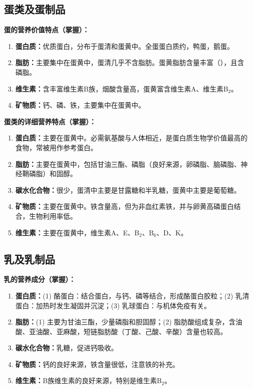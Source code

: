 \subsection{蛋类及蛋制品}

\begin{keybox}
\textbf{蛋的营养价值特点（掌握）：}
\begin{enumerate}[leftmargin=*]
    \item \textbf{蛋白质：}优质蛋白，分布于蛋清和蛋黄中。全蛋蛋白质约，鸭蛋，鹅蛋。
    \item \textbf{脂肪：}主要集中在蛋黄中，蛋清几乎不含脂肪。蛋黄脂肪含量丰富（），且含磷脂。
    \item \textbf{维生素：}含丰富维生素B族，烟酸含量高，蛋黄富含维生素A、维生素B$_2$。
    \item \textbf{矿物质：}钙、磷、铁，主要集中在蛋黄中。
\end{enumerate}
\end{keybox}

\begin{keybox}
\textbf{蛋类的详细营养特点（掌握）：}
\begin{enumerate}[leftmargin=*]
    \item \textbf{蛋白质：}主要在蛋黄中。必需氨基酸与人体相近，是蛋白质生物学价值最高的食物，常被用作参考蛋白。
    \item \textbf{脂肪：}主要在蛋黄中，包括甘油三酯、磷脂（良好来源，卵磷脂、脑磷脂、神经鞘磷脂）和固醇。
    \item \textbf{碳水化合物：}很少，蛋清中主要是甘露糖和半乳糖，蛋黄中主要是葡萄糖。
    \item \textbf{矿物质：}主要在蛋黄中。铁含量高，但为非血红素铁，并与卵黄高磷蛋白结合，生物利用率低。
    \item \textbf{维生素：}主要在蛋黄中，维生素A、E、B$_2$、B$_6$、D、K。
\end{enumerate}
\end{keybox}

\subsection{乳及乳制品}

\begin{keybox}
\textbf{乳的营养成分（掌握）：}
\begin{enumerate}[leftmargin=*]
    \item \textbf{蛋白质：}(1) 酪蛋白：结合蛋白，与钙、磷等结合，形成酪蛋白胶粒；(2) 乳清蛋白：加热时发生凝固并沉淀；(3) 乳球蛋白：与机体免疫有关。
    \item \textbf{脂肪：}(1) 主要为甘油三酯，少量磷脂和胆固醇；(2) 脂肪酸组成复杂，含油酸、亚油酸、亚麻酸，短链脂肪酸（丁酸、己酸、辛酸）含量也较高。
    \item \textbf{碳水化合物：}乳糖，促进钙吸收。
    \item \textbf{矿物质：}钙的良好来源，铁含量很低，注意铁的补充。
    \item \textbf{维生素：}B族维生素的良好来源，特别是维生素B$_2$。
\end{enumerate}
\end{keybox}

